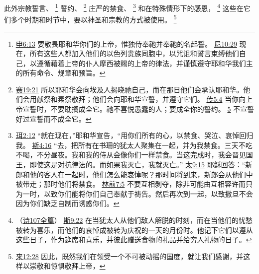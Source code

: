 \documentclass[12pt, a4paper, oneside]{ctexart}
\begin{document}
	此外宗教誓言、
	\footnote {
		\href{https://biblehub.com/deuteronomy/6-13.htm}{申6:13} 要敬畏耶和华你们的上帝，惟独侍奉祂并奉祂的名起誓。
		\href{https://biblehub.com/nehemiah/10-29.htm}{尼10:29} 现在，所有这些人都加入他们的以色列贵族同胞中，以咒诅和誓言束缚他们自己，以遵循藉着上帝的仆人摩西被赐的上帝的律法，并谨慎遵守耶和华我们主的所有命令、规章和预旨。
	}
	誓约、
	\footnote {
		\href{https://biblehub.com/isaiah/19-21.htm}{赛19:21} 所以耶和华会向埃及人揭晓祂自己，而在那日他们会承认耶和华。他们会用献祭和素祭敬拜；他们会向耶和华宣誓，并遵守它们。
		\href{https://biblehub.com/ecclesiastes/5-4.htm}{传5:4} 当你向上帝宣誓时，不要耽搁成全它。祂不喜悦愚蠢的人；要成全你的誓约。
		\href{https://biblehub.com/ecclesiastes/5-5.htm}{5} 不宣誓好过宣誓而不成全它。
	}
	庄严的禁食、
	\footnote {
		\href{https://biblehub.com/joel/2-12.htm}{珥2:12} “就在现在，”耶和华宣告，“用你们所有的心，以禁食、哭泣、哀悼回归我。
		\href{https://biblehub.com/esther/4-16.htm}{斯4:16} “去，把所有在书珊的犹太人聚集在一起，并为我禁食。三天不吃不喝，不分昼夜。我和我的侍从会像你们一样禁食。当这完成时，我会晋见国王，即使这是对抗律法的。而如果我灭亡，我就灭亡。”
		\href{https://biblehub.com/matthew/9-15.htm}{太9:15} 耶稣回答：“新郎和他的客人在一起时，他们怎么能哀悼呢？那时间将到来，新郎会从他们中被带走；那时他们将禁食。
		\href{https://biblehub.com/1_corinthians/7-5.htm}{林前7:5} 不要互相剥夺，除非可能由互相容许而只为一时，以致你们能将你们自己奉献于祷告。然后再次到一起，以致撒旦不会因为你们缺乏自制而诱惑你们。
	}
	和在特殊情形下的感恩，
	\footnote {
		（\href{https://biblehub.com/niv/psalms/107.htm}{诗107全篇}）
		\href{https://biblehub.com/esther/9-22.htm}{斯9:22} 在当犹太人从他们敌人解脱的时刻，而在当他们的忧愁被转为喜乐，而他们的哀悼成被转为庆祝的一天的月份时。他记下它们以遵从这些日子，作为筵席和喜乐，并彼此赠送食物的礼品并给穷人礼物的日子。
	}
	这些在它们多个时期和时节中，要以神圣和宗教的方式被使用。
	\footnote {
		\href{https://biblehub.com/hebrews/12-28.htm}{来12:28} 因此，既然我们在领受一个不可被动摇的国度，就让我们感谢，并这样以崇敬和惊惧敬拜上帝，
	}
\end{document}
